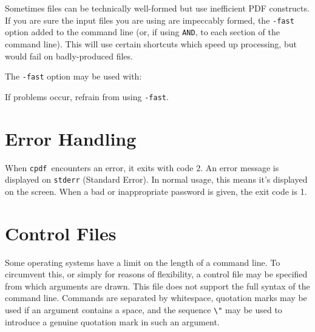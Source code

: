\documentclass{book}
\newcommand{\cpdf}{\texttt{cpdf}}
\begin{document}
\noindent Sometimes files can be technically well-formed but use inefficient PDF
constructs.  If you are sure the input files you are using are
impeccably formed, the \texttt{-fast} option added to the command line (or, if
using \texttt{AND}, to each section of the command line). This will use certain
shortcuts which speed up processing, but would fail on badly-produced files.

The \verb!-fast! option may be used with:

\noindent{}


\noindent If problems occur, refrain from using \verb!-fast!.

\section{Error Handling}
When \cpdf\ encounters an error, it exits with code 2. An error message is
displayed on \texttt{stderr} (Standard Error). In normal usage, this means it's
displayed on the screen. When a bad or inappropriate password is given, the exit code is 1.


\section{Control Files}

\noindent{}



Some operating systems have a limit on the length of a command line. To
circumvent this, or simply for reasons of flexibility, a control file may be
specified from which arguments are drawn. This file does not support the full
syntax of the command line. Commands are separated by whitespace, quotation
marks may be used if an argument contains a space, and the sequence \verb!\"!
may be used to introduce a genuine quotation mark in such an argument.
\end{document}
